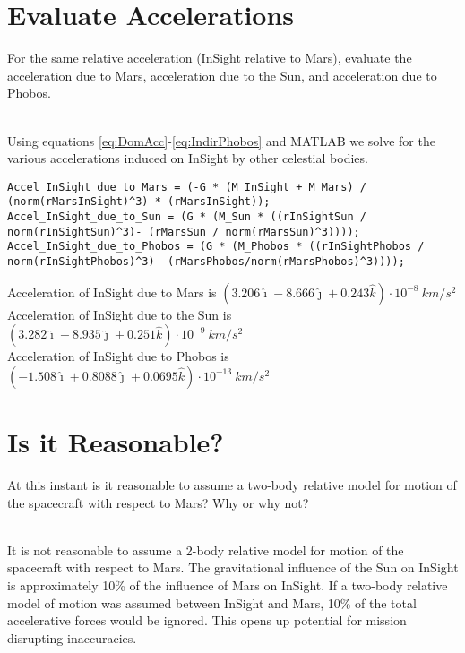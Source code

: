 \documentclass[hidelinks,12pt]{article}
\begin{document}
\begin{flushleft}
\section{Evaluate Accelerations}
\begin{large}
  For the same relative acceleration (InSight relative to Mars), evaluate the acceleration due to Mars, acceleration due to the Sun, and acceleration due to Phobos.
\end{large}\\
\vspace{5px}
Using equations \ref{eq:DomAcc}-\ref{eq:IndirPhobos} and MATLAB we solve for the various accelerations induced on InSight by other celestial bodies.
\vspace{5px}
\begin{lstlisting}[frame=lines,style=Matlab-editor,basicstyle = \mlttfamily]
Accel_InSight_due_to_Mars = (-G * (M_InSight + M_Mars) / (norm(rMarsInSight)^3) * (rMarsInSight));
Accel_InSight_due_to_Sun = (G * (M_Sun * ((rInSightSun / norm(rInSightSun)^3)- (rMarsSun / norm(rMarsSun)^3))));
Accel_InSight_due_to_Phobos = (G * (M_Phobos * ((rInSightPhobos / norm(rInSightPhobos)^3)- (rMarsPhobos/norm(rMarsPhobos)^3))));
\end{lstlisting}
\vspace{5px}
Acceleration of InSight due to Mars is $(3.206 \hat{\imath} -8.666 \hat{\jmath} + 0.243\hat{k}) \cdot 10^{-8}~km/s^2$\\
Acceleration of InSight due to the Sun is $(3.282 \hat{\imath} -8.935 \hat{\jmath} + 0.251 \hat{k}) \cdot 10^{-9}~km/s^2$\\
Acceleration of InSight due to Phobos is $(-1.508 \hat{\imath} + 0.8088 \hat{\jmath} + 0.0695 \hat{k}) \cdot 10^{-13}~km/s^2$
\section{Is it Reasonable?}
\begin{large}
  At this instant is it reasonable to assume a two-body relative model for motion of the spacecraft with respect to Mars? Why or why not?
\end{large}\\
\vspace{5px}
It is not reasonable to assume a 2-body relative model for motion of the spacecraft with respect to Mars. The gravitational influence of the Sun on InSight is approximately 10\% of the influence of Mars on InSight. If a two-body relative model of motion was assumed between InSight and Mars, 10\% of the total accelerative forces would be ignored. This opens up potential for mission disrupting inaccuracies.

\end{flushleft}
\newpage

\end{document}
